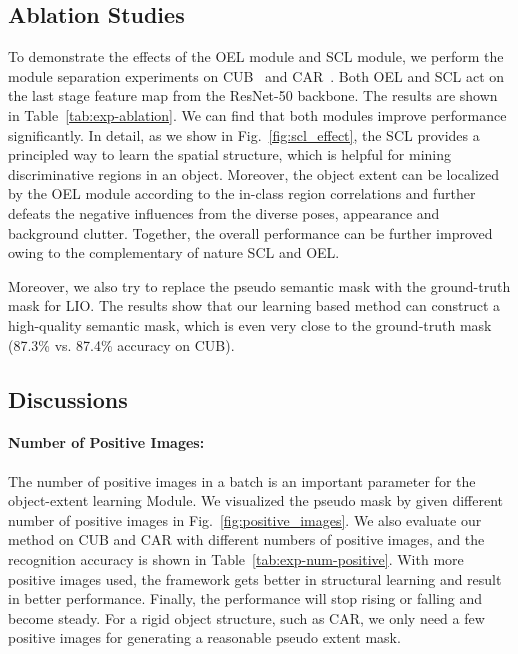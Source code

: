 \documentclass[10pt,twocolumn,letterpaper]{article}
\begin{document}
\subsection{Ablation Studies}

To demonstrate the effects of the OEL module and SCL module, we perform the module separation experiments on CUB~\cite{CUB} and CAR~\cite{CAR}. 
Both OEL and SCL act on the last stage feature map from the ResNet-50 backbone.
The results are shown in Table~\ref{tab:exp-ablation}. We can find that both modules improve performance significantly. In detail, as we show in Fig.~\ref{fig:scl_effect}, the SCL provides a principled way to learn the spatial structure, which is helpful for mining discriminative regions in an object. Moreover, the object extent can be localized by the OEL module according to the in-class region correlations and further defeats the negative influences from the diverse poses, appearance and background clutter. Together, the overall performance can be further improved owing to the complementary of nature SCL and OEL. 

Moreover, we also try to replace the pseudo semantic mask  with the ground-truth mask for LIO. The results show that our learning based method can construct a high-quality semantic mask, which is even very close to the ground-truth mask (87.3\% vs. 87.4\% accuracy on CUB). 

\subsection{Discussions}
\paragraph{\textbf{Number of Positive Images:}}
The number  of positive images in a batch is an important parameter for the object-extent learning Module. We visualized the pseudo mask  by given different number of positive images  in Fig.~\ref{fig:positive_images}. We also evaluate our method on CUB and CAR with different numbers of positive images, and the recognition accuracy is shown in Table~\ref{tab:exp-num-positive}. 
With more positive images used, the framework gets better in structural learning and result in better performance. Finally, the performance will stop rising or falling and become steady. For a rigid object structure, such as CAR, we only need a few positive images for generating a reasonable pseudo extent mask. 
\end{document}
